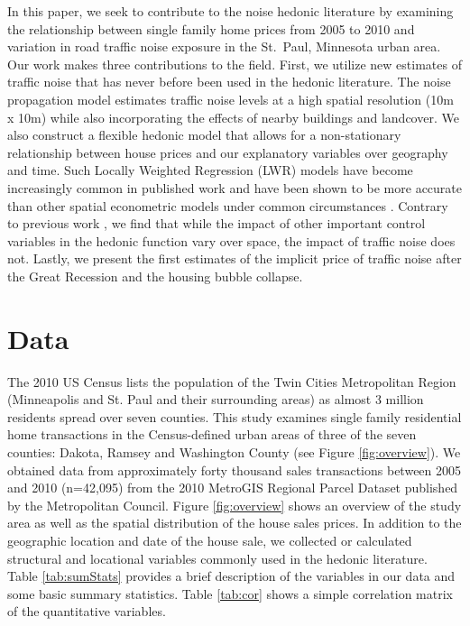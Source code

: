 \documentclass{article}\usepackage{graphicx, color}
\begin{document}
In this paper, we seek to contribute to the noise hedonic literature by examining the relationship between single family home prices from 2005 to 2010 and variation in road traffic noise exposure in the St.\ Paul, Minnesota urban area. Our work makes three contributions to the field. First, we utilize new estimates of traffic noise that has never before been used in the hedonic literature. The noise propagation model estimates traffic noise levels at a high spatial resolution (10m x 10m) while also incorporating the effects of nearby buildings and landcover. We also construct a flexible hedonic model that allows for a non-stationary relationship between house prices and our explanatory variables over geography and time. Such Locally Weighted Regression (LWR) models have become increasingly common in published work \citep[see][]{MarmolejoDuarteCarlos;GonzalezTamez2009, Carruthers2010, Sunding2010, Nappi-Choulet2011} and have been shown to be more accurate than other spatial econometric models under common circumstances \citep{McMillen2012}. Contrary to previous work \citep{MarmolejoDuarteCarlos;GonzalezTamez2009}, we find that while the impact of other important control variables in the hedonic function vary over space, the impact of traffic noise does not. Lastly, we present the first estimates of the implicit price of traffic noise after the Great Recession and the housing bubble collapse.

\section{Data}
The 2010 US Census lists the population of the Twin Cities Metropolitan Region (Minneapolis and St. Paul and their surrounding areas)  as almost 3 million residents spread over seven counties. This study examines single family residential home transactions in the Census-defined urban areas of three of the seven counties: Dakota, Ramsey and Washington County (see Figure \ref{fig:overview}). We obtained data from approximately forty thousand sales transactions between 2005 and 2010 (n=42,095) from the 2010 MetroGIS Regional Parcel Dataset published by the Metropolitan Council. Figure \ref{fig:overview} shows an overview of the study area as well as the spatial distribution of the house sales prices. In addition to the geographic location and date of the house sale, we collected or calculated structural and locational variables commonly used in the hedonic literature. Table \ref{tab:sumStats} provides a brief description of the variables in our data and some basic summary statistics. Table \ref{tab:cor} shows a simple correlation matrix of the quantitative variables.
\end{document}
